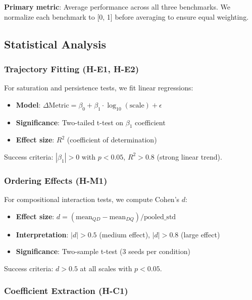 \textbf{Primary metric}: Average performance across all three benchmarks. We normalize each benchmark to [0, 1] before averaging to ensure equal weighting.

\subsection{Statistical Analysis}

\subsubsection{Trajectory Fitting (H-E1, H-E2)}

For saturation and persistence tests, we fit linear regressions:

\begin{itemize}
\item \textbf{Model}: $\Delta\text{Metric} = \beta_0 + \beta_1 \cdot \log_{10}(\text{scale}) + \epsilon$
\item \textbf{Significance}: Two-tailed t-test on $\beta_1$ coefficient
\item \textbf{Effect size}: $R^2$ (coefficient of determination)
\end{itemize}

Success criteria: $|\beta_1| > 0$ with $p < 0.05$, $R^2 > 0.8$ (strong linear trend).

\subsubsection{Ordering Effects (H-M1)}

For compositional interaction tests, we compute Cohen's $d$:

\begin{itemize}
\item \textbf{Effect size}: $d = (\text{mean}_{QD} - \text{mean}_{DQ}) / \text{pooled\_std}$
\item \textbf{Interpretation}: $|d| > 0.5$ (medium effect), $|d| > 0.8$ (large effect)
\item \textbf{Significance}: Two-sample t-test (3 seeds per condition)
\end{itemize}

Success criteria: $d > 0.5$ at all scales with $p < 0.05$.

\subsubsection{Coefficient Extraction (H-C1)}

